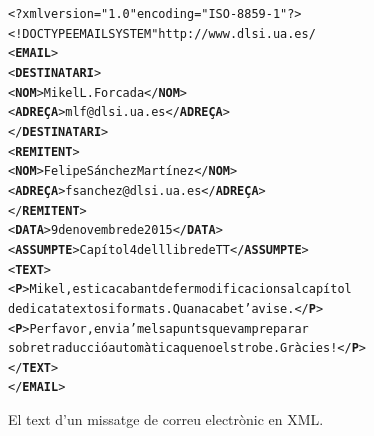 \begin{figure}
\begin{center}
\begin{alltt}
<?xml version="1.0" encoding="ISO-8859-1"?>
<!DOCTYPE EMAIL SYSTEM "http://www.dlsi.ua.es/%
<\textbf{EMAIL}>
  <\textbf{DESTINATARI}>
    <\textbf{NOM}>Mikel L. Forcada</\textbf{NOM}>
    <\textbf{ADREÇA}>mlf@dlsi.ua.es</\textbf{ADREÇA}>
  </\textbf{DESTINATARI}>
  <\textbf{REMITENT}>
    <\textbf{NOM}>Felipe Sánchez Martínez</\textbf{NOM}>
    <\textbf{ADREÇA}>fsanchez@dlsi.ua.es</\textbf{ADREÇA}>
  </\textbf{REMITENT}>
  <\textbf{DATA}>9 de novembre de 2015</\textbf{DATA}>
  <\textbf{ASSUMPTE}>Capítol 4 del llibre de TT</\textbf{ASSUMPTE}>
  <\textbf{TEXT}>
    <\textbf{P}>Mikel, estic acabant de fer modificacions al capítol 
    dedicat a textos i formats. Quan acabe t'avise.</\textbf{P}>
    <\textbf{P}>Per favor, envia'm els apunts que vam preparar 
    sobre traducció automàtica que no els trobe. Gràcies!</\textbf{P}>
  </\textbf{TEXT}>
</\textbf{EMAIL}>
\end{alltt}
\end{center}
\caption{El text d'un missatge de correu electrònic en XML.}
\label{fg:faxXML}
\end{figure}

